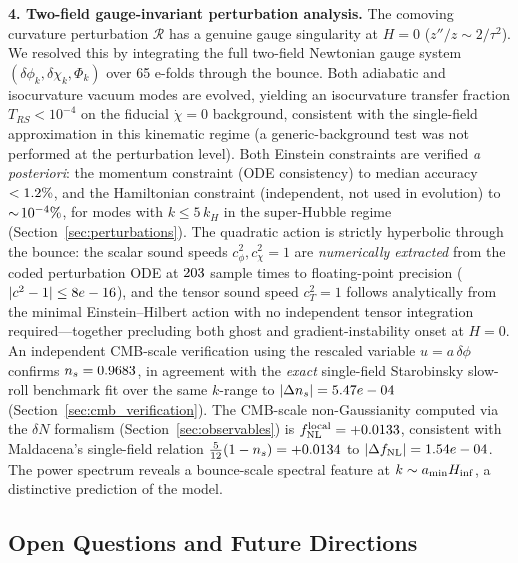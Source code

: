 \documentclass[11pt,a4paper]{article}
\begin{document}
\textbf{4. Two-field gauge-invariant perturbation analysis.} The comoving curvature perturbation $\mathcal{R}$ has a genuine gauge singularity at $H=0$ ($z''/z \sim 2/\tau^2$). We resolved this by integrating the full two-field Newtonian gauge system $(\delta\phi_k, \delta\chi_k, \Phi_k)$ over 65 e-folds through the bounce. Both adiabatic and isocurvature vacuum modes are evolved, yielding an isocurvature transfer fraction $T_{RS} < 10^{-4}$ on the fiducial $\dot\chi = 0$ background, consistent with the single-field approximation in this kinematic regime (a generic-background test was not performed at the perturbation level). Both Einstein constraints are verified \emph{a posteriori}: the momentum constraint (ODE consistency) to median accuracy $< 1.2\%$, and the Hamiltonian constraint (independent, not used in evolution) to $\sim\!10^{-4}\%$, for modes with $k \leq 5\,k_H$ in the super-Hubble regime (Section~\ref{sec:perturbations}). The quadratic action is strictly hyperbolic through the bounce: the scalar sound speeds $c_\phi^2, c_\chi^2 = 1$ are \emph{numerically extracted} from the coded perturbation ODE at $203$ sample times to floating-point precision ($|c^2-1| \leq 8e-16$), and the tensor sound speed $c_T^2 = 1$ follows analytically from the minimal Einstein--Hilbert action with no independent tensor integration required---together precluding both ghost and gradient-instability onset at $H = 0$. An independent CMB-scale verification using the rescaled variable $u = a\,\delta\phi$ confirms $n_s = 0.9683$, in agreement with the \emph{exact} single-field Starobinsky slow-roll benchmark fit over the same $k$-range to $|\Delta n_s| = 5.47e-04$ (Section~\ref{sec:cmb_verification}). The CMB-scale non-Gaussianity computed via the $\delta N$ formalism (Section~\ref{sec:observables}) is $f_{\rm NL}^{\rm local} = +0.0133$, consistent with Maldacena's single-field relation $\tfrac{5}{12}(1-n_s) = +0.0134$ to $|\Delta f_{\rm NL}| = 1.54e-04$. The power spectrum reveals a bounce-scale spectral feature at $k \sim a_{\rm min} H_{\rm inf}$, a distinctive prediction of the model.

\subsection{Open Questions and Future Directions}
\end{document}

